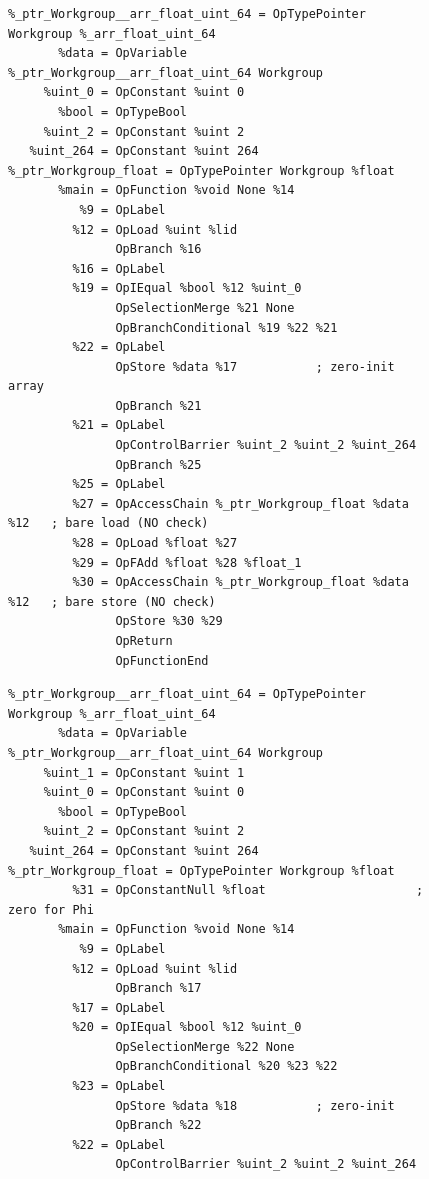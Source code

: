 \documentclass[11pt,a4paper]{article}
\begin{document}
\clearpage
\begin{figure}[h!]
\centering
\begin{lstlisting}[basicstyle=\ttfamily\tiny]
%_arr_float_uint_64 = OpTypeArray %float %uint_64          ; 64 elements
%_ptr_Workgroup__arr_float_uint_64 = OpTypePointer Workgroup %_arr_float_uint_64
       %data = OpVariable %_ptr_Workgroup__arr_float_uint_64 Workgroup
     %uint_0 = OpConstant %uint 0
       %bool = OpTypeBool
     %uint_2 = OpConstant %uint 2
   %uint_264 = OpConstant %uint 264
%_ptr_Workgroup_float = OpTypePointer Workgroup %float
       %main = OpFunction %void None %14
          %9 = OpLabel
         %12 = OpLoad %uint %lid
               OpBranch %16
         %16 = OpLabel
         %19 = OpIEqual %bool %12 %uint_0
               OpSelectionMerge %21 None
               OpBranchConditional %19 %22 %21
         %22 = OpLabel
               OpStore %data %17           ; zero-init array
               OpBranch %21
         %21 = OpLabel
               OpControlBarrier %uint_2 %uint_2 %uint_264
               OpBranch %25
         %25 = OpLabel
         %27 = OpAccessChain %_ptr_Workgroup_float %data %12   ; bare load (NO check)
         %28 = OpLoad %float %27
         %29 = OpFAdd %float %28 %float_1
         %30 = OpAccessChain %_ptr_Workgroup_float %data %12   ; bare store (NO check)
               OpStore %30 %29
               OpReturn
               OpFunctionEnd
\end{lstlisting}
\vspace{2pt}
\begin{lstlisting}[basicstyle=\ttfamily\tiny]
%_arr_float_uint_64 = OpTypeArray %float %uint_64          ; 64 elements
%_ptr_Workgroup__arr_float_uint_64 = OpTypePointer Workgroup %_arr_float_uint_64
       %data = OpVariable %_ptr_Workgroup__arr_float_uint_64 Workgroup
     %uint_1 = OpConstant %uint 1
     %uint_0 = OpConstant %uint 0
       %bool = OpTypeBool
     %uint_2 = OpConstant %uint 2
   %uint_264 = OpConstant %uint 264
%_ptr_Workgroup_float = OpTypePointer Workgroup %float
         %31 = OpConstantNull %float                     ; zero for Phi
       %main = OpFunction %void None %14
          %9 = OpLabel
         %12 = OpLoad %uint %lid
               OpBranch %17
         %17 = OpLabel
         %20 = OpIEqual %bool %12 %uint_0
               OpSelectionMerge %22 None
               OpBranchConditional %20 %23 %22
         %23 = OpLabel
               OpStore %data %18           ; zero-init
               OpBranch %22
         %22 = OpLabel
               OpControlBarrier %uint_2 %uint_2 %uint_264

\end{lstlisting}
\end{figure}
\end{document}
